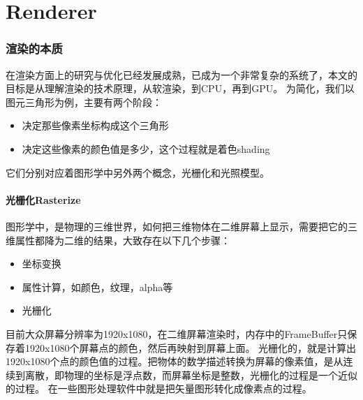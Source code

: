 \clearpage
\part{ Renderer }

\section{渲染的本质}
在渲染方面上的研究与优化已经发展成熟，已成为一个非常复杂的系统了，本文的目标是从理解渲染的技术原理，从软渲染，到CPU，再到GPU。
为简化，我们以图元三角形为例，主要有两个阶段：
\begin{itemize}
    \item {决定那些像素坐标构成这个三角形}
    \item {决定这些像素的颜色值是多少，这个过程就是着色shading}
\end{itemize}
它们分别对应着图形学中另外两个概念，光栅化和光照模型。

\subsection{光栅化Rasterize}

图形学中，是物理的三维世界，如何把三维物体在二维屏幕上显示，需要把它的三维属性都降为二维的结果，大致存在以下几个步骤：

\begin{itemize}
    \item {坐标变换}
    \item {属性计算，如颜色，纹理，alpha等}
    \item {光栅化}
\end{itemize}

目前大众屏幕分辨率为1920x1080，在二维屏幕渲染时，内存中的FrameBuffer只保存着1920x1080个屏幕点的颜色，然后再映射到屏幕上面。
光栅化的，就是计算出1920x1080个点的颜色值的过程。把物体的数学描述转换为屏幕的像素值，是从连续到离散，即物理的坐标是浮点数，而屏幕坐标是整数，光栅化的过程是一个近似的过程。
在一些图形处理软件中就是把矢量图形转化成像素点的过程。

